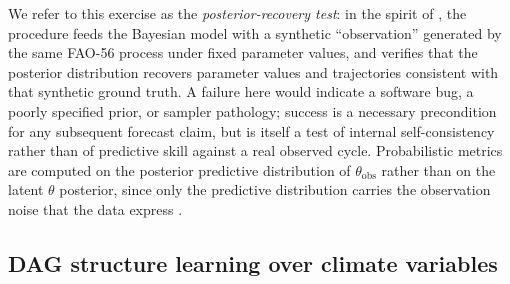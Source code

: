 \documentclass[review,5p,times]{elsarticle}
\begin{document}


We refer to this exercise as the \emph{posterior-recovery test}: in
the spirit of \cite{Cook2006,Talts2018}, the procedure feeds the
Bayesian model with a synthetic ``observation'' generated by the same
FAO-56 process under fixed parameter values, and verifies that the
posterior distribution recovers parameter values and trajectories
consistent with that synthetic ground truth. A failure here would
indicate a software bug, a poorly specified prior, or sampler
pathology; success is a necessary precondition for any subsequent
forecast claim, but is itself a test of internal self-consistency
rather than of predictive skill against a real observed cycle. Probabilistic metrics are computed on the
posterior predictive distribution of $\theta_{\mathrm{obs}}$ rather
than on the latent $\theta$ posterior, since only the predictive
distribution carries the observation noise that the data express
\cite{Vehtari2017}.

\subsection{DAG structure learning over climate variables}
\label{sec:methods_dag}
\end{document}

